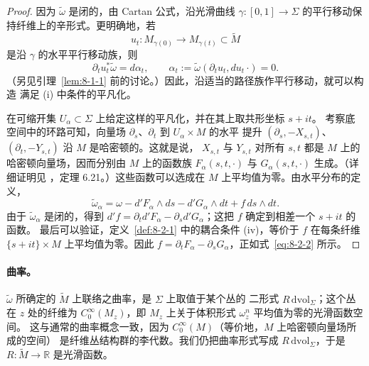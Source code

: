 \begin{proof}
因为 $\widetilde\omega$ 是闭的，由 Cartan 公式，沿光滑曲线
$\gamma:[0,1]\to\Sigma$ 的平行移动保持纤维上的辛形式。更明确地，若
\[
  u_t:M_{\gamma(0)}\longrightarrow M_{\gamma(t)}\subset\widetilde M
\]
是沿 $\gamma$ 的水平平行移动族，则
\[
  \partial_tu_t^*\widetilde\omega=d\alpha_t,
  \qquad
  \alpha_t:=\widetilde\omega(\partial_tu_t,du_t\,\mathord\cdot)=0.
\]
（另见引理~\ref{lem:8-1-1} 前的讨论。）因此，沿适当的路径族作平行移动，就可以构造
满足 (i) 中条件的平凡化。

在可缩开集 $U_\alpha\subset\Sigma$ 上给定这样的平凡化，并在其上取共形坐标 $s+it$。
考察底空间中的环路可知，向量场 $\partial_s$、$\partial_t$ 到 $U_\alpha\times M$ 的水平
提升 $(\partial_s,-X_{s,t})$、$(\partial_t,-Y_{s,t})$ 沿 $M$ 是哈密顿的。这就是说，
$X_{s,t}$ 与 $Y_{s,t}$ 对所有 $s,t$ 都是 $M$ 上的哈密顿向量场，因而分别由 $M$ 上的函数族
$F_\alpha(s,t,\mathord\cdot)$ 与 $G_\alpha(s,t,\mathord\cdot)$ 生成。（详细证明见
，定理 6.21。）这些函数可以选成在 $M$ 上平均值为零。由水平分布的定义，
\[
  \widetilde\omega_\alpha
  =\omega-d'F_\alpha\wedge ds-d'G_\alpha\wedge dt+f\,ds\wedge dt.
\]
由于 $\widetilde\omega_\alpha$ 是闭的，得到
$d'f=\partial_td'F_\alpha-\partial_sd'G_\alpha$；这把 $f$ 确定到相差一个 $s+it$ 的函数。
最后可以验证，定义~\ref{def:8-2-1} 中的耦合条件 (iv)，等价于 $f$ 在每条纤维
$\{s+it\}\times M$ 上平均值为零。因此
$f=\partial_tF_\alpha-\partial_sG_\alpha$，正如式~\eqref{eq:8-2-2} 所示。
\end{proof}

\paragraph{曲率。}
$\widetilde\omega$ 所确定的 $\widetilde M$ 上联络之曲率，是 $\Sigma$ 上取值于某个丛的
二形式 $R\,\mathrm{dvol}_\Sigma$；这个丛在 $z$ 处的纤维为
$C_0^\infty(M_z)$，即 $M_z$ 上关于体积形式 $\omega_z^n$ 平均值为零的光滑函数空间。
这与通常的曲率概念一致，因为 $C_0^\infty(M)$（等价地，$M$ 上哈密顿向量场所成的空间）
是纤维丛结构群的李代数。我们仍把曲率形式写成 $R\,\mathrm{dvol}_\Sigma$，于是
$R:\widetilde M\to\mathbb R$ 是光滑函数。

